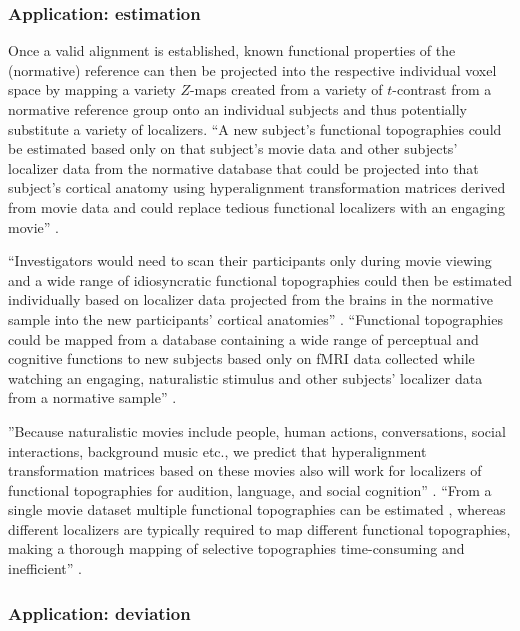 \subsubsection{Application: estimation}

%
Once a valid alignment is established, known functional properties of the
(normative) reference can then be projected into the respective individual voxel
space by mapping a variety $Z$-maps created from a variety of $t$-contrast from
a normative reference group onto an individual subjects and thus potentially
substitute a variety of localizers.
%
``A new subject's functional topographies could be estimated based only on that
subject's movie data and other subjects' localizer data from the normative
database that could be projected into that subject's cortical anatomy using
hyperalignment transformation matrices derived from movie data and could replace
tedious functional localizers with an engaging movie''
\citep{jiahui2020predicting}.

%
``Investigators would need to scan their participants only during movie viewing
and a wide range of idiosyncratic functional topographies could then be
estimated individually based on localizer data projected from the brains in the
normative sample into the new participants' cortical anatomies''
\citep{jiahui2020predicting}.
%
``Functional topographies could be mapped from a database containing a wide
range of perceptual and cognitive functions to new subjects based only on fMRI
data collected while watching an engaging, naturalistic stimulus and other
subjects' localizer data from a normative sample'' \citep{jiahui2020predicting}.

%
''Because naturalistic movies include people, human actions, conversations,
social interactions, background music etc., we predict that hyperalignment
transformation matrices based on these movies also will work for localizers of
functional topographies for audition, language, and social cognition''
\citep{jiahui2020predicting}.
%
``From a single movie dataset multiple functional topographies can be estimated
\citep{guntupalli2016model}, whereas different localizers are typically required
to map different functional topographies, making a thorough mapping of selective
topographies time-consuming and inefficient'' \citep{jiahui2020predicting}.



\subsubsection{Application: deviation}

